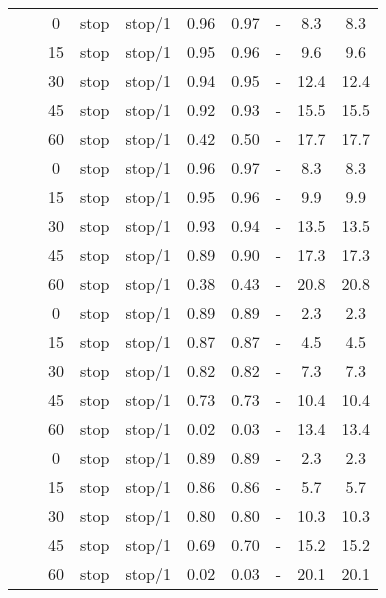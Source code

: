 \begin{longtable}[t]{cccccccccc}
\cmidrule{1-10}\pagebreak[0]
&  & 0 & stop & stop/1 & 0.96 & 0.97 & - & 8.3 & 8.3\\
\nopagebreak
&  & 15 & stop & stop/1 & 0.95 & 0.96 & - & 9.6 & 9.6\\
\nopagebreak
&  & 30 & stop & stop/1 & 0.94 & 0.95 & - & 12.4 & 12.4\\
\nopagebreak
&  & 45 & stop & stop/1 & 0.92 & 0.93 & - & 15.5 & 15.5\\
\nopagebreak
& \multirow{-5}{*}{\centering\arraybackslash 0.2} & 60 & stop & stop/1 & 0.42 & 0.50 & - & 17.7 & 17.7\\
\nopagebreak
&  & 0 & stop & stop/1 & 0.96 & 0.97 & - & 8.3 & 8.3\\
\nopagebreak
&  & 15 & stop & stop/1 & 0.95 & 0.96 & - & 9.9 & 9.9\\
\nopagebreak
&  & 30 & stop & stop/1 & 0.93 & 0.94 & - & 13.5 & 13.5\\
\nopagebreak
&  & 45 & stop & stop/1 & 0.89 & 0.90 & - & 17.3 & 17.3\\
\nopagebreak
\multirow{-10}{*}{\centering\arraybackslash 14} & \multirow{-5}{*}{\centering\arraybackslash 0.33} & 60 & stop & stop/1 & 0.38 & 0.43 & - & 20.8 & 20.8\\
\cmidrule{1-10}\pagebreak[0]
&  & 0 & stop & stop/1 & 0.89 & 0.89 & - & 2.3 & 2.3\\
\nopagebreak
&  & 15 & stop & stop/1 & 0.87 & 0.87 & - & 4.5 & 4.5\\
\nopagebreak
&  & 30 & stop & stop/1 & 0.82 & 0.82 & - & 7.3 & 7.3\\
\nopagebreak
&  & 45 & stop & stop/1 & 0.73 & 0.73 & - & 10.4 & 10.4\\
\nopagebreak
& \multirow{-5}{*}{\centering\arraybackslash 0.2} & 60 & stop & stop/1 & 0.02 & 0.03 & - & 13.4 & 13.4\\
\nopagebreak
&  & 0 & stop & stop/1 & 0.89 & 0.89 & - & 2.3 & 2.3\\
\nopagebreak
&  & 15 & stop & stop/1 & 0.86 & 0.86 & - & 5.7 & 5.7\\
\nopagebreak
&  & 30 & stop & stop/1 & 0.80 & 0.80 & - & 10.3 & 10.3\\
\nopagebreak
&  & 45 & stop & stop/1 & 0.69 & 0.70 & - & 15.2 & 15.2\\
\nopagebreak
\multirow{-10}{*}{\centering\arraybackslash 15} & \multirow{-5}{*}{\centering\arraybackslash 0.33} & 60 & stop & stop/1 & 0.02 & 0.03 & - & 20.1 & 20.1\\*
\end{longtable}
\endgroup{}

